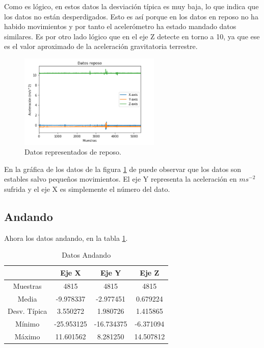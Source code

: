 \documentclass[12pt]{book}
\numberwithin{equation}{section}
\begin{document}
Como es lógico, en estos datos la desviación típica es muy baja, lo que indica que los datos no están desperdigados. Esto es así porque en los datos en reposo no ha habido movimientos y por tanto el acelerómetro ha estado mandado datos similares. Es por otro lado lógico que en el eje Z detecte en torno a 10, ya que ese es el valor aproximado de la aceleración gravitatoria terrestre.

\begin{figure}[h]
    \centering
    \includegraphics[width=0.6\textwidth]{reposodatos.png}
    \caption{Datos representados de reposo.}
    \label{fig:reposodatos}
\end{figure}

En la gráfica de los datos de la figura \ref{fig:reposodatos} de puede observar que los datos son estables salvo pequeños movimientos. El eje Y representa la aceleración en $m s^{-2}$ sufrida y el eje X es simplemente el número del dato.

\newpage
\subsection{Andando}

Ahora los datos andando, en la tabla \ref{tabla4}.

\begin{table}[h]
\centering
\caption{Datos Andando}
\begin{tabular}{| c | c | c | c |}
\hline
 & Eje X & Eje Y & Eje Z \\
\hline
Muestras & 4815 & 4815 & 4815 \\
\hline
Media & -9.978337 & -2.977451 & 0.679224 \\
\hline
Desv. Típica & 3.550272 & 1.980726 & 1.415865 \\
\hline
Mínimo & -25.953125 & -16.734375 & -6.371094 \\
\hline
Máximo & 11.601562 & 8.281250 & 14.507812 \\
\hline
\end{tabular}
\label{tabla4}
\end{table}
\end{document}
